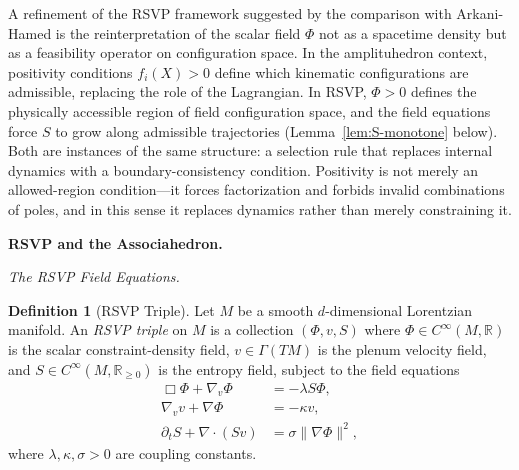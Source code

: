 \documentclass[11pt]{article}
\theoremstyle{plain}
\theoremstyle{definition}
\newtheorem{definition}[theorem]{Definition}
\theoremstyle{remark}
\newcommand{\R}{\mathbb{R}}
\newcommand{\Phif}{\Phi}
\newcommand{\vf}{v}
\newcommand{\Sf}{S}
\begin{document}
A refinement of the RSVP framework suggested by the comparison with Arkani-Hamed is the reinterpretation of the scalar field $\Phif$ not as a spacetime density but as a feasibility operator on configuration space. In the amplituhedron context, positivity conditions $f_i(X) > 0$ define which kinematic configurations are admissible, replacing the role of the Lagrangian. In RSVP, $\Phif > 0$ defines the physically accessible region of field configuration space, and the field equations force $\Sf$ to grow along admissible trajectories (Lemma~\ref{lem:S-monotone} below). Both are instances of the same structure: a selection rule that replaces internal dynamics with a boundary-consistency condition. Positivity is not merely an allowed-region condition---it forces factorization and forbids invalid combinations of poles, and in this sense it replaces dynamics rather than merely constraining it.

\bigskip\noindent\textbf{RSVP and the Associahedron.}
\label{sec:rsvp}

\medskip\noindent\textit{The RSVP Field Equations.}

\begin{definition}[RSVP Triple]
Let $M$ be a smooth $d$-dimensional Lorentzian manifold. An \emph{RSVP triple} on $M$ is a collection $(\Phif, \vf, \Sf)$ where $\Phif \in C^\infty(M, \R)$ is the scalar constraint-density field, $\vf \in \Gamma(TM)$ is the plenum velocity field, and $\Sf \in C^\infty(M, \R_{\geq 0})$ is the entropy field, subject to the field equations
\begin{align}
  \Box \Phif + \nabla_\vf \Phif &= -\lambda \Sf \Phif, \label{eq:phi}\\
  \nabla_\vf \vf + \nabla \Phif &= -\kappa \vf, \label{eq:v}\\
  \partial_t \Sf + \nabla \cdot (\Sf \vf) &= \sigma \|\nabla \Phif\|^2, \label{eq:S}
\end{align}
where $\lambda, \kappa, \sigma > 0$ are coupling constants.
\end{definition}
\end{document}
